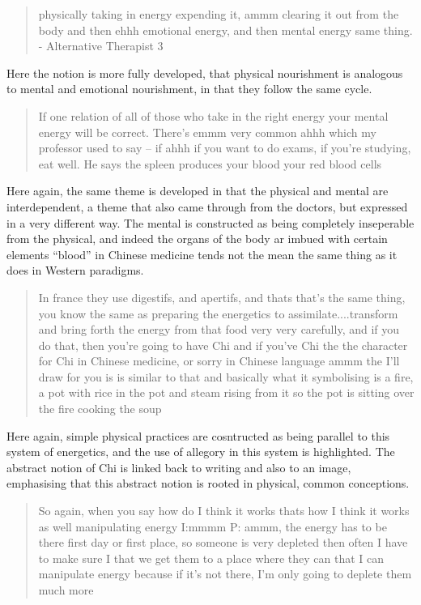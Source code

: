 \begin{quotation}
  physically taking in energy expending it, ammm clearing it out from the body and then ehhh emotional energy, and then mental energy same thing.
- Alternative Therapist 3
\end{quotation}

Here the notion is more fully developed, that physical nourishment is analogous to mental and emotional nourishment, in that they follow the same cycle. 


\begin{quotation}
  If one relation of all of those who take in the right energy your mental energy will be correct. There's emmm very common ahhh which my professor used to say – if ahhh if you want to do exams, if you're studying, eat well. He says the spleen produces your blood your red blood cells 

\end{quotation}

Here again, the same theme is developed in that the physical and mental are interdependent, a theme that also came through from the doctors, but expressed in a very different way. The mental is constructed as being completely inseperable from the physical, and indeed the organs of the body ar imbued with certain elements ``blood'' in Chinese medicine tends not the mean the same thing as it does in Western paradigms. 

\begin{quotation}
   In france they use digestifs, and apertifs, and thats that's the same thing, you know the same as preparing the energetics to assimilate....transform and bring forth the energy from that food very very carefully, and if you do that, then you're going to have Chi and if you've Chi the the character for Chi in Chinese medicine, or sorry in Chinese language ammm the I'll draw for you is is similar to that and basically what it symbolising is a fire, a pot with rice in the pot and steam rising from it so the pot is sitting over the fire cooking the soup 

\end{quotation}

Here again, simple physical practices are cosntructed as being parallel to this system of energetics, and the use of allegory in this system is highlighted. The abstract notion of Chi is linked back to writing and also to an image, emphasising that this abstract notion is rooted in physical, common conceptions. 


\begin{quotation}
  So again, when you say how do I think it works thats how I think it works as well manipulating energy
I:mmmm
P: ammm, the energy has to be there first day or first place, so someone is very depleted then often I have to make sure I that we get them to a place where they can that I can manipulate energy because if it's not there, I'm only going to deplete them much more


\end{quotation}

